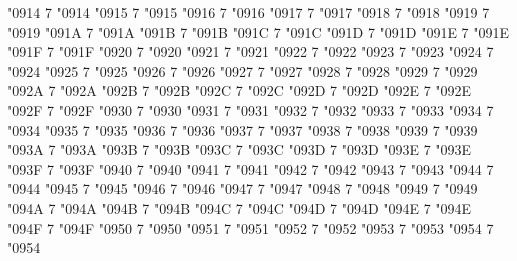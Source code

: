\Umathcode "0914 7 \symoperators "0914%
\Umathcode "0915 7 \symoperators "0915%
\Umathcode "0916 7 \symoperators "0916%
\Umathcode "0917 7 \symoperators "0917%
\Umathcode "0918 7 \symoperators "0918%
\Umathcode "0919 7 \symoperators "0919%
\Umathcode "091A 7 \symoperators "091A%
\Umathcode "091B 7 \symoperators "091B%
\Umathcode "091C 7 \symoperators "091C%
\Umathcode "091D 7 \symoperators "091D%
\Umathcode "091E 7 \symoperators "091E%
\Umathcode "091F 7 \symoperators "091F%
%
\Umathcode "0920 7 \symoperators "0920%
\Umathcode "0921 7 \symoperators "0921%
\Umathcode "0922 7 \symoperators "0922%
\Umathcode "0923 7 \symoperators "0923%
\Umathcode "0924 7 \symoperators "0924%
\Umathcode "0925 7 \symoperators "0925%
\Umathcode "0926 7 \symoperators "0926%
\Umathcode "0927 7 \symoperators "0927%
\Umathcode "0928 7 \symoperators "0928%
\Umathcode "0929 7 \symoperators "0929%
\Umathcode "092A 7 \symoperators "092A%
\Umathcode "092B 7 \symoperators "092B%
\Umathcode "092C 7 \symoperators "092C%
\Umathcode "092D 7 \symoperators "092D%
\Umathcode "092E 7 \symoperators "092E%
\Umathcode "092F 7 \symoperators "092F%
%
\Umathcode "0930 7 \symoperators "0930%
\Umathcode "0931 7 \symoperators "0931%
\Umathcode "0932 7 \symoperators "0932%
\Umathcode "0933 7 \symoperators "0933%
\Umathcode "0934 7 \symoperators "0934%
\Umathcode "0935 7 \symoperators "0935%
\Umathcode "0936 7 \symoperators "0936%
\Umathcode "0937 7 \symoperators "0937%
\Umathcode "0938 7 \symoperators "0938%
\Umathcode "0939 7 \symoperators "0939%
\Umathcode "093A 7 \symoperators "093A%
\Umathcode "093B 7 \symoperators "093B%
\Umathcode "093C 7 \symoperators "093C%
\Umathcode "093D 7 \symoperators "093D%
\Umathcode "093E 7 \symoperators "093E%
\Umathcode "093F 7 \symoperators "093F%
%
\Umathcode "0940 7 \symoperators "0940%
\Umathcode "0941 7 \symoperators "0941%
\Umathcode "0942 7 \symoperators "0942%
\Umathcode "0943 7 \symoperators "0943%
\Umathcode "0944 7 \symoperators "0944%
\Umathcode "0945 7 \symoperators "0945%
\Umathcode "0946 7 \symoperators "0946%
\Umathcode "0947 7 \symoperators "0947%
\Umathcode "0948 7 \symoperators "0948%
\Umathcode "0949 7 \symoperators "0949%
\Umathcode "094A 7 \symoperators "094A%
\Umathcode "094B 7 \symoperators "094B%
\Umathcode "094C 7 \symoperators "094C%
\Umathcode "094D 7 \symoperators "094D%
\Umathcode "094E 7 \symoperators "094E%
\Umathcode "094F 7 \symoperators "094F%
%
\Umathcode "0950 7 \symoperators "0950%
\Umathcode "0951 7 \symoperators "0951%
\Umathcode "0952 7 \symoperators "0952%
\Umathcode "0953 7 \symoperators "0953%
\Umathcode "0954 7 \symoperators "0954%

